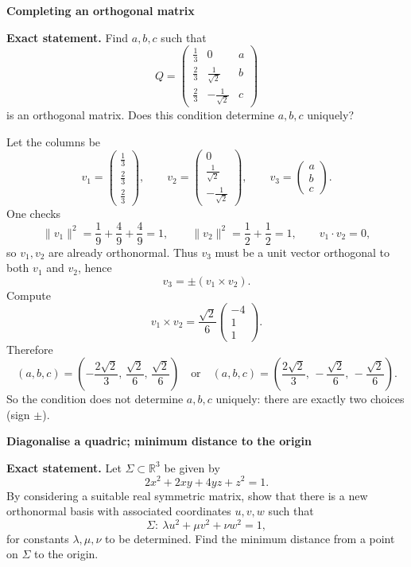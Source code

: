 \begin{problem}[CP-I-0011]
\label{prob:cp-i-0011}
\textbf{Completing an orthogonal matrix}

\textbf{Exact statement.}
\hspace*{1.5em}Find $a,b,c$ such that
\[
Q=\begin{pmatrix}
	\frac13&0&a\\[2pt]
	\frac23&\frac1{\sqrt2}&b\\[2pt]
	\frac23&-\frac1{\sqrt2}&c
\end{pmatrix}
\]
is an orthogonal matrix. Does this condition determine $a,b,c$ uniquely?

\end{problem}

\begin{solution}
Let the columns be
\[
v_1=\begin{pmatrix}\frac13\\\frac23\\\frac23\end{pmatrix},\qquad
v_2=\begin{pmatrix}0\\\frac1{\sqrt2}\\-\frac1{\sqrt2}\end{pmatrix},\qquad
v_3=\begin{pmatrix}a\\b\\c\end{pmatrix}.
\]
One checks
\[
\|v_1\|^2=\frac19+\frac49+\frac49=1,\qquad
\|v_2\|^2=\frac12+\frac12=1,\qquad
v_1\cdot v_2=0,
\]
so $v_1,v_2$ are already orthonormal.
Thus $v_3$ must be a unit vector orthogonal to both $v_1$ and $v_2$, hence
\[
v_3=\pm(v_1\times v_2).
\]
Compute
\[
v_1\times v_2=\frac{\sqrt2}{6}\begin{pmatrix}-4\\1\\1\end{pmatrix}.
\]
Therefore
\[
(a,b,c)=\left(-\frac{2\sqrt2}{3},\,\frac{\sqrt2}{6},\,\frac{\sqrt2}{6}\right)
\quad\text{or}\quad
(a,b,c)=\left(\frac{2\sqrt2}{3},\,-\frac{\sqrt2}{6},\,-\frac{\sqrt2}{6}\right).
\]
So the condition does not determine $a,b,c$ uniquely: there are exactly two choices (sign $\pm$).
\end{solution}

\begin{problem}[CP-I-0012]
\label{prob:cp-i-0012}
\textbf{Diagonalise a quadric; minimum distance to the origin}

\textbf{Exact statement.}
\hspace*{1.5em}Let $\Sigma\subset\mathbb R^3$ be given by
\[
2x^2+2xy+4yz+z^2=1.
\]
By considering a suitable real symmetric matrix, show that there is a new orthonormal basis with associated coordinates $u,v,w$ such that
\[
\Sigma:\ \lambda u^2+\mu v^2+\nu w^2=1,
\]
for constants $\lambda,\mu,\nu$ to be determined. Find the minimum distance from a point on $\Sigma$ to the origin.

\end{problem}

